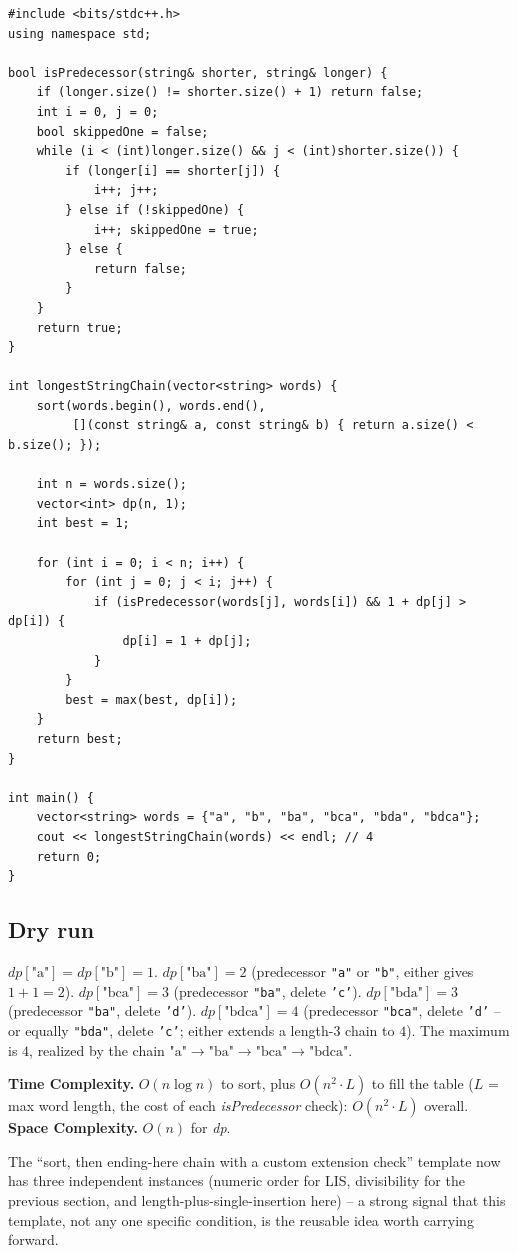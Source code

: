 \begin{lstlisting}
#include <bits/stdc++.h>
using namespace std;

bool isPredecessor(string& shorter, string& longer) {
    if (longer.size() != shorter.size() + 1) return false;
    int i = 0, j = 0;
    bool skippedOne = false;
    while (i < (int)longer.size() && j < (int)shorter.size()) {
        if (longer[i] == shorter[j]) {
            i++; j++;
        } else if (!skippedOne) {
            i++; skippedOne = true;
        } else {
            return false;
        }
    }
    return true;
}

int longestStringChain(vector<string> words) {
    sort(words.begin(), words.end(),
         [](const string& a, const string& b) { return a.size() < b.size(); });

    int n = words.size();
    vector<int> dp(n, 1);
    int best = 1;

    for (int i = 0; i < n; i++) {
        for (int j = 0; j < i; j++) {
            if (isPredecessor(words[j], words[i]) && 1 + dp[j] > dp[i]) {
                dp[i] = 1 + dp[j];
            }
        }
        best = max(best, dp[i]);
    }
    return best;
}

int main() {
    vector<string> words = {"a", "b", "ba", "bca", "bda", "bdca"};
    cout << longestStringChain(words) << endl; // 4
    return 0;
}
\end{lstlisting}

\subsection*{Dry run}


$\textit{dp}[\text{"a"}]=\textit{dp}[\text{"b"}]=1$.
$\textit{dp}[\text{"ba"}]=2$ (predecessor \texttt{"a"} or \texttt{"b"},
either gives $1+1=2$). $\textit{dp}[\text{"bca"}]=3$ (predecessor
\texttt{"ba"}, delete \texttt{'c'}). $\textit{dp}[\text{"bda"}]=3$
(predecessor \texttt{"ba"}, delete \texttt{'d'}).
$\textit{dp}[\text{"bdca"}]=4$ (predecessor \texttt{"bca"}, delete
\texttt{'d'} -- or equally \texttt{"bda"}, delete \texttt{'c'}; either
extends a length-$3$ chain to $4$). The maximum is $4$, realized by the
chain $\text{"a"} \to \text{"ba"} \to \text{"bca"} \to \text{"bdca"}$.

\begin{complexitybox}
\textbf{Time Complexity.} $O(n \log n)$ to sort, plus $O(n^2 \cdot L)$
to fill the table ($L$ = max word length, the cost of each
\textit{isPredecessor} check): $O(n^2 \cdot L)$ overall.
\textbf{Space Complexity.} $O(n)$ for \textit{dp}.
\end{complexitybox}

\begin{takeawaybox}
The ``sort, then ending-here chain with a custom extension check''
template now has three independent instances (numeric order for LIS,
divisibility for the previous section, and length-plus-single-insertion
here) -- a strong signal that this template, not any one specific
condition, is the reusable idea worth carrying forward.
\end{takeawaybox}
